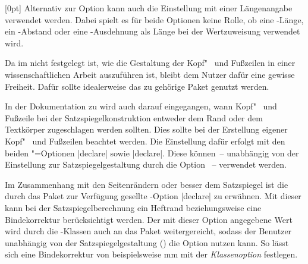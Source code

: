 \begin{Declaration*}{}
\begin{Declaration*}{}
\begin{Declaration*}{}
\begin{Declaration}[v2.03]{}[0pt]
Alternativ zur Option  kann auch die Einstellung 
 mit einer Längenangabe verwendet werden. 
Dabei spielt es für beide Optionen keine Rolle, ob eine -Länge, 
ein -Abstand oder eine -Ausdehnung als Länge bei der 
Wertzuweisung verwendet wird.
\end{Declaration}

%
%
%
Da im \CD nicht festgelegt ist, wie die Gestaltung der Kopf"~ und Fußzeilen in 
einer wissenschaftlichen Arbeit auszuführen ist, bleibt dem Nutzer dafür eine 
gewisse Freiheit. Dafür sollte idealerweise das zu \KOMAScript{} gehörige Paket 
 genutzt werden. 

In der Dokumentation zu  wird auch darauf eingegangen, wann 
Kopf"~ und Fußzeile bei der Satzspiegelkonstruktion entweder dem Rand oder dem 
Textkörper zugeschlagen werden sollten. Dies sollte bei der Erstellung eigener 
Kopf"~ und Fußzeilen beachtet werden. Die Einstellung dafür erfolgt mit den 
beiden \KOMAScript"=Optionen |declare| sowie 
|declare|. Diese können~-- unabhängig von der 
Einstellung zur Satzspiegelgestaltung durch die Option ~-- 
verwendet werden.

%
%
Im Zusammenhang mit den Seitenrändern oder besser dem Satzspiegel ist die durch 
das Paket  zur Verfügung gesellte \KOMAScript-Option 
|declare| zu erwähnen. Mit dieser kann bei der 
Satzspiegelberechnung ein Heftrand beziehungsweise eine Bindekorrektur 
berücksichtigt werden. Der mit dieser Option angegebene Wert wird durch die 
\TUDScript-Klassen auch an das Paket  weitergereicht, sodass 
der Benutzer unabhängig von der Satzspiegelgestaltung () die 
Option  nutzen kann. So lässt sich eine Bindekorrektur von 
beispielsweise \unit[5]{mm} mit der \emph{Klassenoption}  
festlegen.


\end{Declaration*}
\end{Declaration*}
\end{Declaration*}
